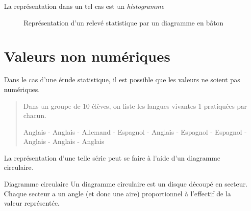 \documentclass[titre=Stastistiques, classe=Troisième]{jeanmonnet}
\begin{document}
La représentation dans un tel cas est un \emph{histogramme}

\begin{figure}[H]
\centering
	\caption{Représentation d'un relevé statistique par un diagramme en bâton}
\end{figure}

\section{Valeurs non numériques}

Dans le cas d'une étude statistique, il est possible que les valeurs ne soient pas numériques.

\begin{quote}
	Dans un groupe de 10 élèves, on liste les langues vivantes 1 pratiquées par chacun.

\bigskip

	Anglais - Anglais - Allemand - Espagnol - Anglais - Espagnol - Espagnol - Anglais - Anglais - Anglais
\end{quote}

La représentation d'une telle série peut se faire à l'aide d'un diagramme circulaire.

\begin{definition}{Diagramme circulaire}{}
	Un diagramme circulaire est un disque découpé en secteur. Chaque secteur a un angle (et donc une aire) proportionnel à l'effectif de la valeur représentée.
\end{definition}
\end{document}
